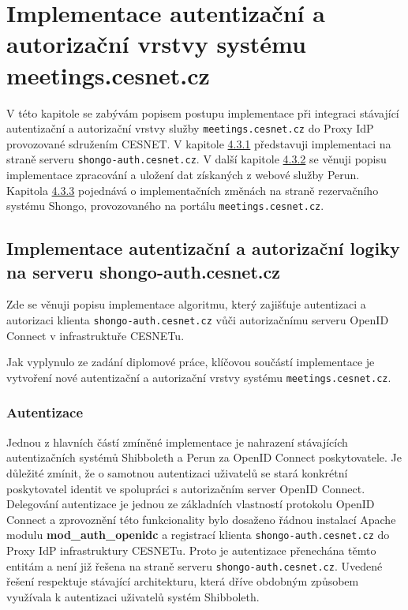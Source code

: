 \documentclass[
  printed, %
  twoside, %
  table,   %
  nolof,     %
  nolot,     %
]{fithesis3}
\begin{document}
\section{Implementace autentizační a autorizační vrstvy systému meetings.cesnet.cz}
\label{ShongoImpl}
V této kapitole se zabývám popisem postupu implementace při integraci stávající autentizační a autorizační vrstvy služby \texttt{meetings.cesnet.cz} do Proxy IdP provozované sdružením CESNET. V kapitole \hyperref[ShongoImpl-authn]{4.3.1} představuji implementaci na straně serveru \texttt{shongo-auth.cesnet.cz}. V další kapitole \hyperref[zpracovaniAUlozeniPerun]{4.3.2} se věnuji popisu implementace zpracování a uložení dat získaných z webové služby Perun. Kapitola \hyperref[ShongoImpl-web]{4.3.3} pojednává o implementačních změnách na straně rezervačního systému Shongo, provozovaného na portálu \texttt{meetings.cesnet.cz}. 

\subsection{Implementace autentizační a autorizační logiky na serveru shongo-auth.cesnet.cz}
\label{ShongoImpl-authn}
Zde se věnuji popisu implementace algoritmu, který zajišťuje autentizaci a autorizaci klienta \texttt{shongo-auth.cesnet.cz} vůči autorizačnímu serveru OpenID Connect v infrastruktuře CESNETu.  \par

Jak vyplynulo ze zadání diplomové práce, klíčovou součástí implementace je vytvoření nové autentizační a autorizační vrstvy systému \texttt{meetings.cesnet.cz}. 

\subsubsection{Autentizace}

Jednou z hlavních částí zmíněné implementace je nahrazení stávajících autentizačních systémů Shibboleth a Perun za OpenID Connect poskytovatele.
Je důležité zmínit, že o samotnou autentizaci uživatelů se stará konkrétní poskytovatel identit ve spolupráci s autorizačním server OpenID Connect. Delegování autentizace je jednou ze základních vlastností protokolu OpenID Connect a zprovoznění této funkcionality bylo dosaženo řádnou instalací Apache modulu \textbf{mod\_auth\_openidc} a registrací klienta \texttt{shongo-auth.cesnet.cz} do Proxy IdP infrastruktury CESNETu. Proto je autentizace přenechána těmto entitám a není již řešena na straně serveru \texttt{shongo-auth.cesnet.cz}. Uvedené řešení respektuje stávající architekturu, která dříve obdobným způsobem využívala k autentizaci uživatelů systém Shibboleth. 
\end{document}
